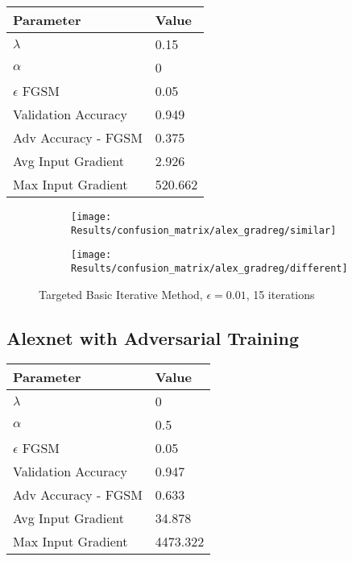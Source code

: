 \documentclass[draft,final]{vutinfth} %
\begin{document}
\begin{table}[h]
  \centering
  \begin{tabular}{ll}
    \toprule
			Parameter			& Value   \\
    \midrule
			$\lambda$								& 0.15		\\
			$\alpha$								& 0				\\
			$\epsilon$ FGSM					& 0.05		\\
			
			Validation Accuracy			& 0.949		\\
			Adv Accuracy - FGSM			& 0.375		\\
			
			Avg Input Gradient			& 2.926		\\
			Max Input Gradient			& 520.662 \\
    \bottomrule
  \end{tabular}
\end{table}


\begin{figure}[h]
  \begin{subfigure}[b]{0.75\columnwidth}
		\centering
    \texttt{[image: Results/confusion\_matrix/alex\_gradreg/similar]}%
    \label{fig:exp:cm:alex_gradreg:similar}
  \end{subfigure}
  \begin{subfigure}[b]{0.75\columnwidth}
		\centering
    \texttt{[image: Results/confusion\_matrix/alex\_gradreg/different]}
    \label{fig:exp:cm:alex_gradreg:different}
  \end{subfigure}
  \caption{Targeted Basic Iterative Method, $\epsilon = 0.01$, 15 iterations}
  \label{fig:intro} %
\end{figure}

\subsection{Alexnet with Adversarial Training}
\begin{table}[h]
  \centering
  \begin{tabular}{ll}
    \toprule
			Parameter			& Value   \\
    \midrule
			$\lambda$								& 0				\\
			$\alpha$								& 0.5			\\
			$\epsilon$ FGSM					& 0.05		\\
			
			Validation Accuracy			& 0.947		\\
			Adv Accuracy - FGSM			& 0.633 	\\
			
			Avg Input Gradient			& 34.878	\\
			Max Input Gradient 			& 4473.322\\
    \bottomrule
  \end{tabular}
\end{table}
\end{document}
